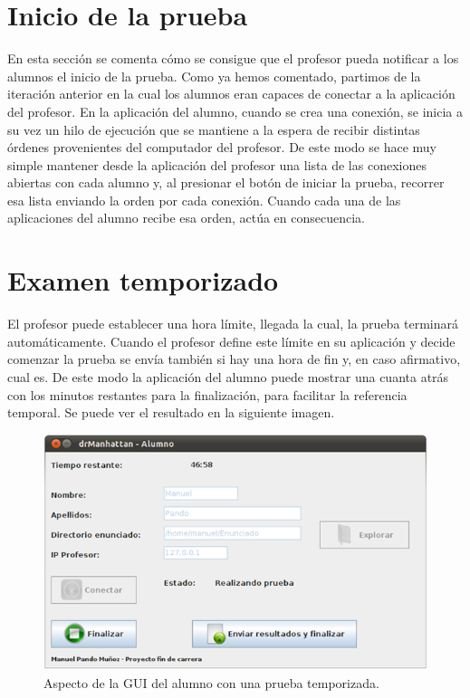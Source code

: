 \section{Inicio de la prueba}
\label{sec:iteracion:iniPrueba}

En esta sección se comenta cómo se consigue que el profesor pueda notificar a los alumnos el inicio de la prueba.
Como ya hemos comentado, partimos de la iteración anterior en la cual los alumnos eran capaces de conectar a la aplicación del profesor. En la aplicación del alumno, cuando se crea una conexión, se inicia a su vez un hilo de ejecución que se mantiene a la espera de recibir distintas órdenes provenientes del computador del profesor. De este modo se hace muy simple mantener desde la aplicación del profesor una lista de las conexiones abiertas con cada alumno y, al presionar el botón de iniciar la prueba, recorrer esa lista enviando la orden por cada conexión.
Cuando cada una de las aplicaciones del alumno recibe esa orden, actúa en consecuencia.

\section{Examen temporizado}
\label{sec:iteracion:examenTemporizado}

El profesor puede establecer una hora límite, llegada la cual, la prueba terminará automáticamente. Cuando el profesor define este límite en su aplicación y decide comenzar la prueba se envía también si hay una hora de fin y, en caso afirmativo, cual es. De este modo la aplicación del alumno puede mostrar una cuanta atrás con los minutos restantes para la finalización, para facilitar la referencia temporal. Se puede ver el resultado en la siguiente imagen.

\begin{figure}[!htb]
    \centering
    \includegraphics[width=.90\linewidth]{iteracion/tiempoRestante}
    \caption{Aspecto de la GUI del alumno con una prueba temporizada.}
    \label{fig:iteracion:tiempoRestante}
\end{figure}


